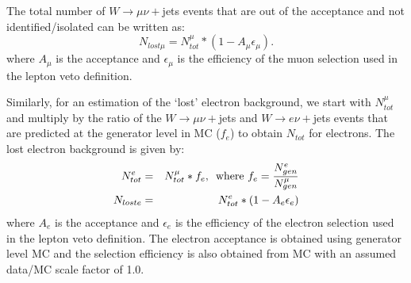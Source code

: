 The total number of $W \rightarrow \mu\nu +$jets events that are out of the acceptance and not identified/isolated can be written as:
\begin{equation}
N_{lost \mu} = N_{tot}^{\mu}*(1 - A_{\mu}\epsilon_{\mu}).
\end{equation}
where $A_{\mu}$ is the acceptance and $\epsilon_{\mu}$ is the efficiency of the muon selection used in the lepton veto definition.

Similarly, for an estimation of the `lost' electron background, we start with $N_{tot}^{\mu}$ and multiply by the ratio of the 
$W \rightarrow \mu\nu +$jets and $W \rightarrow e \nu +$jets events that are predicted at the generator level in MC ($f_e$) 
to obtain $N_{tot}$ for electrons. The lost electron background is given by:
\begin{eqnarray}
N_{tot}^{e}&=& N_{tot}^{\mu}*f_e,\,\,\, {\rm where }\,\, f_{e} = \frac{N_{gen}^{e}}{N_{gen}^{\mu}}\\
N_{lost e} &=& N_{tot}^{e}*(1 - A_{e}\epsilon_{e})\\
\end{eqnarray}
where $A_{e}$ is the acceptance and $\epsilon_{e}$ is the efficiency of the electron selection used in the lepton veto definition.
The electron acceptance is obtained using generator level MC and the selection efficiency is also obtained from MC with an assumed data/MC scale factor of 1.0.%

